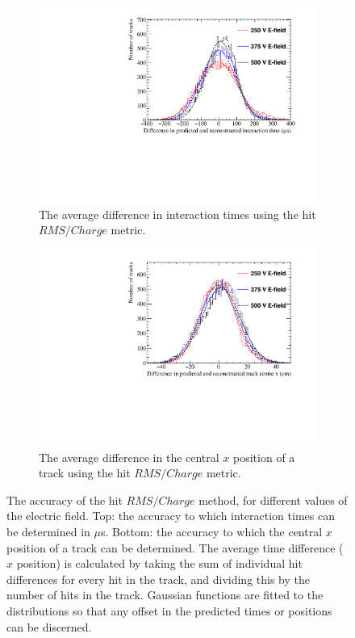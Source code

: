 \begin{figure}
  \centering
  \begin{subfigure}{0.6\textwidth}
    \centering
    \includegraphics[width=\textwidth]{Canvas_AvDiff_T_RMS_Q_ElecField}
    \caption{The average difference in interaction times using the hit $RMS/Charge$ metric.}
    \label{fig:DiffElecStudy_AvDiff_RMS_Int_T}
  \end{subfigure}
  \begin{subfigure}{0.6\textwidth}
    \centering
    \includegraphics[width=\textwidth]{Canvas_AvDiff_X_RMS_Q_ElecField}
    \caption{The average difference in the central $x$ position of a track using the hit $RMS/Charge$ metric.}
    \label{fig:DiffElecStudy_AvDiff_RMS_Int_X}
  \end{subfigure}
  \caption[Comparing the accuracy of the hit $RMS$ method, as the electric field changes]
          {The accuracy of the hit $RMS/Charge$ method, for different values of the electric field. Top: the accuracy to which interaction times can be determined in $\mu$s. Bottom: the accuracy to which the central $x$ position of a track can be determined. The average time difference ($x$ position) is calculated by taking the sum of individual hit differences for every hit in the track, and dividing this by the number of hits in the track. Gaussian functions are fitted to the distributions so that any offset in the predicted times or positions can be discerned.}
  \label{fig:DiffElecStudy_AvDiff_RMS_Int}
\end{figure}

